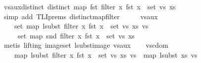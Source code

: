 \begin{isabellebody}
\ vs{\isacharunderscore}{\kern0pt}aux{\isacharunderscore}{\kern0pt}distinct{\isacharcolon}{\kern0pt}\ {\isachardoublequoteopen}distinct\ {\isacharparenleft}{\kern0pt}map\ fst\ {\isacharparenleft}{\kern0pt}{\isacharparenleft}{\kern0pt}filter\ {\isacharparenleft}{\kern0pt}{\isasymlambda}x{\isachardot}{\kern0pt}\ fst\ x\ {\isasymin}\ set\ vs{\isacharparenright}{\kern0pt}\ xs{\isacharparenright}{\kern0pt}{\isacharparenright}{\kern0pt}{\isacharparenright}{\kern0pt}{\isachardoublequoteclose}\isanewline
\ \ \ \ \isamarkupfalse%
\ {\isacharparenleft}{\kern0pt}simp\ add{\isacharcolon}{\kern0pt}\ TLI{\isachardot}{\kern0pt}prems{\isacharparenleft}{\kern0pt}{}{\isacharparenright}{\kern0pt}\ distinct{\isacharunderscore}{\kern0pt}map{\isacharunderscore}{\kern0pt}filter{\isacharparenright}{\kern0pt}\isanewline
\ \ \isamarkupfalse%
\ \isamarkupfalse%
\ vs{\isacharunderscore}{\kern0pt}aux{}{\isacharcolon}{\kern0pt}\isanewline
\ \ \ \ {\isachardoublequoteopen}set\ {\isacharparenleft}{\kern0pt}map\ {\isacharparenleft}{\kern0pt}lsubst\ {\isacharparenleft}{\kern0pt}filter\ {\isacharparenleft}{\kern0pt}{\isasymlambda}x{\isachardot}{\kern0pt}\ fst\ x\ {\isasymin}\ set\ vs{\isacharparenright}{\kern0pt}\ xs{\isacharparenright}{\kern0pt}{\isacharparenright}{\kern0pt}\ vs{\isacharparenright}{\kern0pt}\ {\isacharequal}{\kern0pt}\isanewline
\ \ \ \ \ set\ {\isacharparenleft}{\kern0pt}map\ snd\ {\isacharparenleft}{\kern0pt}filter\ {\isacharparenleft}{\kern0pt}{\isasymlambda}x{\isachardot}{\kern0pt}\ fst\ x\ {\isasymin}\ set\ vs{\isacharparenright}{\kern0pt}\ xs{\isacharparenright}{\kern0pt}{\isacharparenright}{\kern0pt}{\isachardoublequoteclose}\isanewline
\ \ \ \ \isamarkupfalse%
\ {\isacharparenleft}{\kern0pt}metis\ {\isacharparenleft}{\kern0pt}lifting{\isacharparenright}{\kern0pt}\ image{\isacharunderscore}{\kern0pt}set\ lsubst{\isacharunderscore}{\kern0pt}image\ vs{\isacharunderscore}{\kern0pt}aux{}{\isacharparenright}{\kern0pt}\isanewline
\ \ \isamarkupfalse%
\ vs{\isacharunderscore}{\kern0pt}cdom{}{\isacharcolon}{\kern0pt}\isanewline
\ \ \ \ {\isachardoublequoteopen}map\ {\isacharparenleft}{\kern0pt}lsubst\ {\isacharparenleft}{\kern0pt}filter\ {\isacharparenleft}{\kern0pt}{\isasymlambda}x{\isachardot}{\kern0pt}\ fst\ x\ {\isasymin}\ set\ vs{\isacharparenright}{\kern0pt}\ xs{\isacharparenright}{\kern0pt}{\isacharparenright}{\kern0pt}\ vs\ {\isacharequal}{\kern0pt}\ map\ {\isacharparenleft}{\kern0pt}lsubst\ xs{\isacharparenright}{\kern0pt}\ vs{\isachardoublequoteclose}\isanewline

\end{isabellebody}
